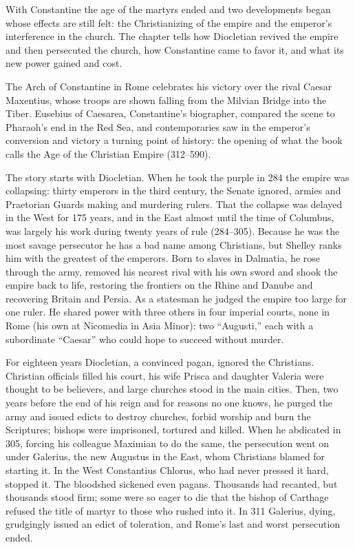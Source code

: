 
\begin{inbrief}
With Constantine the age of the martyrs ended and two developments began whose effects are still felt:
the Christianizing of the empire and the emperor's interference in the church. The chapter tells how
Diocletian revived the empire and then persecuted the church, how Constantine came to favor it, and
what its new power gained and cost.
\end{inbrief}

The Arch of Constantine in Rome celebrates his victory over the rival Caesar Maxentius, whose troops
are shown falling from the Milvian Bridge into the Tiber. Eusebius of Caesarea, Constantine's
biographer, compared the scene to Pharaoh's end in the Red Sea, and contemporaries saw in the
emperor's conversion and victory a turning point of history: the opening of what the book calls the Age of the Christian Empire (312--590).

The story starts with Diocletian. When he took the purple in 284 the empire was collapsing: thirty
emperors in the third century, the Senate ignored, armies and Praetorian Guards making and murdering
rulers. That the collapse was delayed in the West for 175 years, and in the East almost until the
time of Columbus, was largely his work during twenty years of rule (284--305). Because he was the
most savage persecutor he has a bad name among Christians, but Shelley ranks him with the greatest of the emperors. Born to slaves in Dalmatia, he rose through the army, removed his nearest rival
with his own sword and shook the empire back to life, restoring the frontiers on the Rhine and Danube
and recovering Britain and Persia. As a statesman he judged the empire too large for one ruler. He
shared power with three others in four imperial courts, none in Rome (his own at Nicomedia in Asia
Minor): two ``Augusti,'' each with a subordinate ``Caesar'' who could hope to succeed without murder.

For eighteen years Diocletian, a convinced pagan, ignored the Christians. Christian officials filled
his court, his wife Prisca and daughter Valeria were thought to be believers, and large churches stood
in the main cities. Then, two years before the end of his reign and for reasons no one knows, he
purged the army and issued edicts to destroy churches, forbid worship and burn the Scriptures; bishops
were imprisoned, tortured and killed. When he abdicated in 305, forcing his colleague Maximian to do
the same, the persecution went on under Galerius, the new Augustus in the East, whom Christians blamed
for starting it. In the West Constantius Chlorus, who had never pressed it hard, stopped it. The
bloodshed sickened even pagans. Thousands had recanted, but thousands stood firm; some were so eager
to die that the bishop of Carthage refused the title of martyr to those who rushed into it. In 311
Galerius, dying, grudgingly issued an edict of toleration, and Rome's last and worst persecution
ended.


